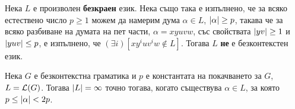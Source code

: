 \begin{cor}
  \label{cor:pumping-context-free}
  Нека $L$ е произволен {\bf безкраен} език. Нека също така е изпълнено, че за всяко естествено число $p \geq 1$ можем да намерим дума $\alpha \in L$, $\lvert{\alpha}\rvert\geq p$, такава че за всяко разбиване на думата на пет части, $\alpha = xyuvw$,
  със свойствата $\lvert{yv}\rvert \geq 1$ и $\lvert{yuv}\rvert \leq p$, е изпълнено, че $(\exists i)[xy^iuv^iw \not\in L]$.
  Тогава $L$ {\bf не} е безконтекстен език.
\end{cor}

\begin{cor}
  Нека $G$ е безконтекстна граматика и $p$ е константата на покачването за $G$, $L = \mathcal{L}(G)$.
  Тогава $\lvert{L}\rvert = \infty$ точно тогава, когато съществува $\alpha \in L$, за която $p \leq \lvert{\alpha}\rvert < 2p$.
\end{cor}




